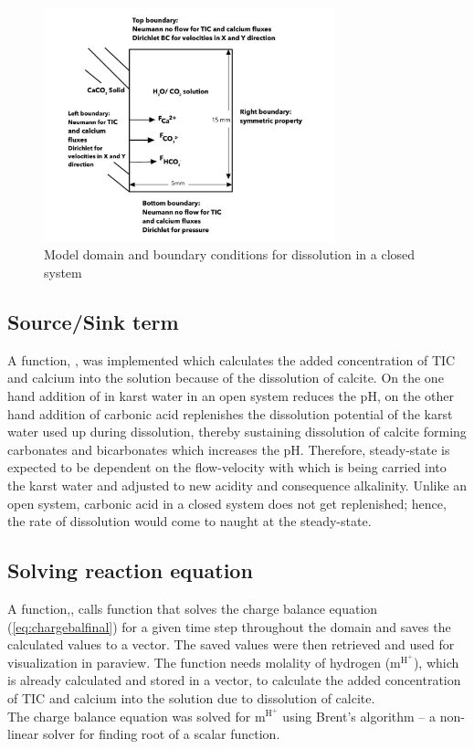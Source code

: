 \begin{figure}
    \centering
    \includegraphics[width=0.75\textwidth]{PICTURES/closed_system.jpg}
    \caption{Model domain and boundary conditions for  dissolution in a closed system}
    \label{fig:ClosedSystem}       %
\end{figure}
 

\subsection*{Source/Sink term} A function, , was implemented which calculates the added concentration of 
TIC and calcium into the solution because of the dissolution of calcite. On the one hand addition of  in karst water in an open system 
reduces the pH, on the other hand addition of carbonic acid replenishes the dissolution potential of the karst water used up  
during dissolution, thereby sustaining dissolution of calcite forming carbonates and bicarbonates which increases the pH. 
Therefore, steady-state is expected to be dependent on the flow-velocity with which  is being carried into the karst water 
and adjusted to new acidity and consequence alkalinity. Unlike an open system, carbonic acid in a closed system does not get 
replenished; hence, the rate of dissolution would come to naught at the steady-state. 


\subsection*{Solving reaction equation} A function,, calls  function that solves the charge 
balance equation (\ref{eq:chargebalfinal}) for a given time step throughout the domain and saves the calculated values to a vector. 
The saved values were then retrieved and used for visualization in paraview. The function  needs molality of 
hydrogen ($\mathrm{m^{H^+}}$), which is already calculated and stored in a vector, to calculate the added concentration of TIC 
and calcium into the solution due to dissolution of calcite. \\
The charge balance equation was solved for $\mathrm{m^{H^+}}$ using Brent's algorithm \cite{brent1971algorithm} -- a non-linear solver 
for finding root of a scalar function. 


